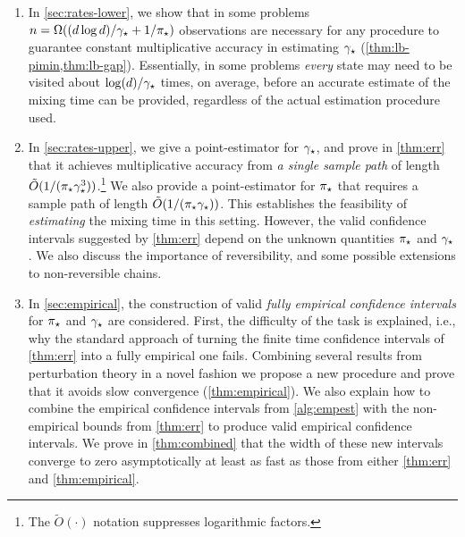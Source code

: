 \begin{enumerate}
  \item
    In \cref{sec:rates-lower}, we show that in some problems 
    $n = \Omega( (d\log d)/\gamma_{\star} + 1/\pi_{\star})$ observations are necessary for any procedure
    to guarantee constant multiplicative accuracy in estimating $\gamma_{\star}$
    (\cref{thm:lb-pimin,thm:lb-gap}).
    Essentially, in some problems \emph{every} state may need to be visited about
    $\log(d)/\gamma_{\star}$ times, on average, before an accurate estimate of
    the mixing time can be provided, regardless of the actual estimation
    procedure used.

  \item
    In \cref{sec:rates-upper}, we give a point-estimator for $\gamma_{\star}$,
    and prove in \cref{thm:err} that it achieves multiplicative
    accuracy from \emph{a single sample path} of length
    $\tilde{O}(1/(\pi_{\star}\gamma_{\star}^3))$.\footnote{The
    $\tilde{O}(\cdot)$ notation suppresses logarithmic factors.}
    We also provide a point-estimator for $\pi_{\star}$ that requires a sample
    path of length $\tilde{O}(1/(\pi_{\star}\gamma_{\star}))$.
    This establishes the feasibility of \emph{estimating} the mixing
    time in this setting.
    However, the valid confidence intervals suggested by
    \cref{thm:err} depend on the unknown quantities $\pi_{\star}$ and
    $\gamma_{\star}$.
    We also discuss the importance of reversibility, and some possible
    extensions to non-reversible chains.

  \item
    In \cref{sec:empirical}, the construction of
    valid \emph{fully empirical confidence intervals} for $\pi_{\star}$ and
    $\gamma_{\star}$ are considered. First, the difficulty of the task is explained,
    i.e., why the standard approach of turning the finite time confidence intervals of
    \cref{thm:err} into a fully empirical one fails.
	Combining several results from perturbation theory in a novel fashion
	we propose a new procedure and prove that it avoids slow convergence
    (\cref{thm:empirical}).
    We also explain how to combine the empirical confidence intervals
    from \cref{alg:empest} with the non-empirical bounds from
    \cref{thm:err} to produce valid empirical confidence intervals.
    We prove in \cref{thm:combined} that the width of these new
    intervals converge to zero asymptotically at least as fast as
    those from either \cref{thm:err} and \cref{thm:empirical}.

\end{enumerate}

